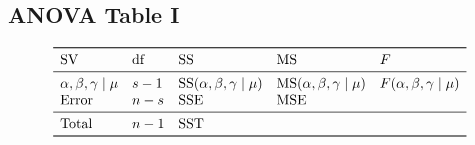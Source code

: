 \subsection*{ANOVA Table I}
\[ \begin{array}{lllll}
        \toprule
        \text{SV}                   & \text{df} & \text{SS}                              & \text{MS}                              & F                              \\
        \midrule
        \alpha,\beta,\gamma\mid \mu & s-1       & \text{SS}(\alpha,\beta,\gamma\mid \mu) & \text{MS}(\alpha,\beta,\gamma\mid \mu) & F(\alpha,\beta,\gamma\mid \mu) \\
        \text{Error}                & n-s       & \SSE                                   & \MSE                                                                    \\
        \midrule
        \text{Total}                & n-1       & \SST                                                                                                             \\
        \bottomrule
    \end{array} \]

